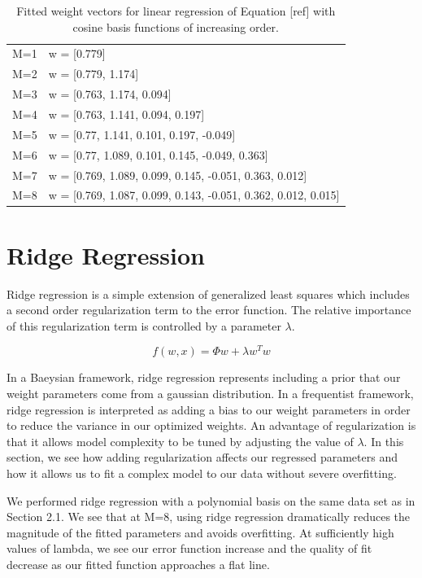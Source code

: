 \documentclass[12pt]{article}
\begin{document}
\begin{table}
\caption{Fitted weight vectors for linear regression of Equation [ref] with cosine basis functions of increasing order.}
\begin{center}
\begin{tabular}{r | l}

M=1 &  w =  [0.779] \\
M=2 &  w =  [0.779, 1.174] \\
M=3 &  w =  [0.763, 1.174, 0.094] \\
M=4 &  w =  [0.763, 1.141, 0.094, 0.197] \\
M=5 &  w =  [0.77, 1.141, 0.101, 0.197, -0.049] \\
M=6 &  w =  [0.77, 1.089, 0.101, 0.145, -0.049, 0.363] \\
M=7 &  w =  [0.769, 1.089, 0.099, 0.145, -0.051, 0.363, 0.012] \\
M=8 &  w =  [0.769, 1.087, 0.099, 0.143, -0.051, 0.362, 0.012, 0.015] \\
\end{tabular}
\end{center}
\label{cosine_weights}

\end{table}

\section{Ridge Regression}

Ridge regression is a simple extension of generalized least squares which includes a second order regularization term to the error function. The relative importance of this regularization term is controlled by a parameter $\lambda$. 

$$f(w,x) = \Phi w + \lambda w^Tw$$

In a Baeysian framework, ridge regression represents including a prior that our weight parameters come from a gaussian distribution. In a frequentist framework, ridge regression is interpreted as adding a bias to our weight parameters in order to reduce the variance in our optimized weights. An advantage of regularization is that it allows model complexity to be tuned by adjusting the value of $\lambda$. In this section, we see how adding regularization affects our regressed parameters and how it allows us to fit a complex model to our data without severe overfitting.

We performed ridge regression with a polynomial basis on the same data set as in Section 2.1. We see that at M=8, using ridge regression dramatically reduces the magnitude of the fitted parameters and avoids overfitting. At sufficiently high values of lambda, we see our error function increase and the quality of fit decrease as our fitted function approaches a flat line.
\end{document}
